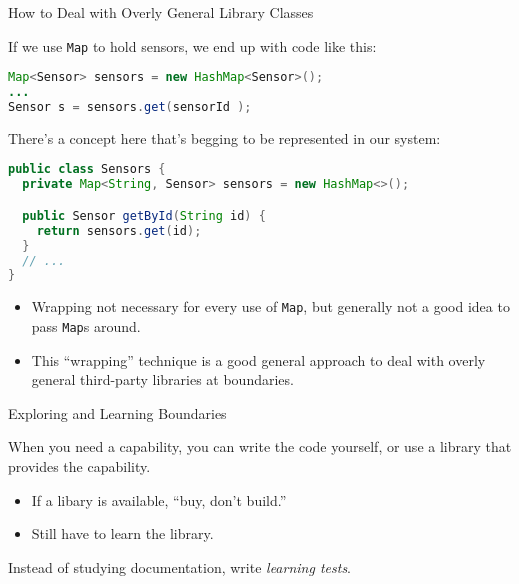 \documentclass{beamer}
\begin{document}
\begin{frame}[fragile]{How to Deal with Overly General Library Classes}


If we use {\tt Map} to hold sensors, we end up with code like this:
\begin{lstlisting}[language=Java]
Map<Sensor> sensors = new HashMap<Sensor>();
...
Sensor s = sensors.get(sensorId );
\end{lstlisting}

There's a concept here that's begging to be represented in our system:
\begin{lstlisting}[language=Java]
public class Sensors {
  private Map<String, Sensor> sensors = new HashMap<>();

  public Sensor getById(String id) {
    return sensors.get(id);
  }
  // ...
}
\end{lstlisting}

\begin{itemize}
\item Wrapping not necessary for every use of {\tt Map}, but generally not a good idea to pass {\tt Map}s around.
\item This ``wrapping'' technique is a good general approach to deal with overly general third-party libraries at boundaries.
\end{itemize}

\end{frame}

\begin{frame}[fragile]{Exploring and Learning Boundaries}


When you need a capability, you can write the code yourself, or use a library that provides the capability.
\begin{itemize}
\item If a libary is available, ``buy, don't build.''
\item Still have to learn the library.
\end{itemize}

Instead of studying documentation, write {\it learning tests}.


\end{frame}
\end{document}

